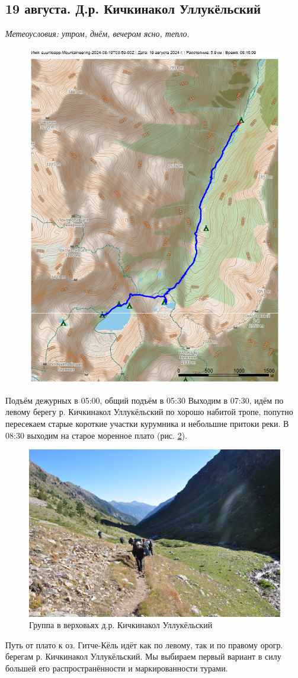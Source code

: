 \subsection{19 августа. Д.р. Кичкинакол Уллукёльский}
\textit{Метеоусловия: утром, днём, вечером ясно, тепло.}

\begin{figure}[h!]
	\centering
	\includegraphics[angle=0, width=0.3\linewidth]{../pics/mini_maps/19}
	\label{fig:mini_19}
\end{figure}

Подъём дежурных в 05:00, общий подъём в 05:30 
Выходим в 07:30, идём по левому берегу р. Кичкинакол Уллукёльский по хорошо набитой тропе, попутно  пересекаем старые короткие участки курумника и небольшие притоки реки. В 08:30 выходим на старое моренное плато (рис. \ref{fig:DSC_0692}).

\begin{figure}[h!]
	\centering
	\includegraphics[width=0.7\linewidth]{../pics/DSC_0692}
	\caption{Группа в верховьях д.р. Кичкинакол Уллукёльский}
	\label{fig:DSC_0692}
\end{figure}

Путь от плато к оз. Гитче-Кёль идёт как по левому, так и по правому орогр. берегам р. Кичкинакол Уллукёльский. Мы выбираем первый вариант в силу большей его распространённости и маркированности турами. 

